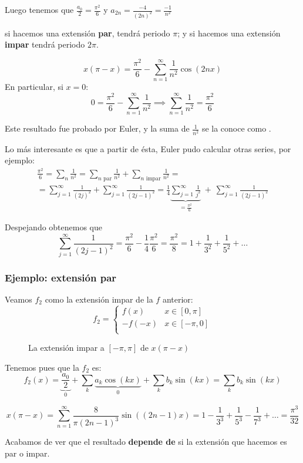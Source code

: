\begin{example}
		Luego tenemos que $\frac{a_0}{2} = \frac{\pi^2}{6}$ y $a_{2n} = \frac{-4}{(2n)^2} = \frac{-1}{n^2}$

		\obs si hacemos una extensión {\bf par}, tendrá periodo $\pi$; y si hacemos una extensión {\bf impar} tendrá periodo $2\pi$.

		\[ x(\pi - x) = \frac{\pi^2}{6} -\sum_{n=1}^{\infty} \frac{1}{n^2} \cos(2n x) \]
		En particular, si $x=0$:
		\[ 0 = \frac{π^2}{6}  - \sum_{n=1}^\infty \frac{1}{n^2} \implies  \sum_{n=1}^\infty \frac{1}{n^2} = \frac{\pi^2}{6} \]

		Este resultado fue probado por Euler, y la suma de $\frac{1}{n^2}$ se la conoce como .

		Lo más interesante es que a partir de ésta, Euler pudo calcular otras series, por ejemplo:
		\begin{gather*}
			\frac{\pi^2}{6} = \sum_n \frac{1}{n^2} = \sum_{n \text{ par}} \frac{1}{n^2} + \sum_{n \text{ impar}} \frac{1}{n^2} =\\
			= \sum_{j=1}^\infty \frac{1}{(2j)^2} + \sum_{j=1}^\infty \frac{1}{(2j-1)^2} = \frac{1}{4} \underbrace{\sum_{j=1}^\infty \frac{1}{j^2}}_{= \frac{\pi^2}{6}} \ + \ \sum_{j=1}^\infty \frac{1}{(2j-1)^2}
		\end{gather*}

		Despejando obtenemos que
		\[ \sum_{j=1}^\infty \frac{1}{(2j-1)^2} = \frac{\pi^2}{6} - \frac{1}{4} \frac{\pi^2}{6} = \frac{\pi^2}{8} = 1 + \frac{1}{3^2} + \frac{1}{5^2} + … \]


		\subsubsection{Ejemplo: extensión par}
		Veamos $f_2$ como la extensión impar de la $f$ anterior:
		\[ f_2 =
		\begin{cases}
		 	f(x) & x \in [0, \pi]\\
		 	-f(-x) & x \in [-\pi, 0]\\
		 \end{cases} \]

		\begin{figure}[hbtp]
			\caption{La extensión impar a $[-\pi,\pi]$ de $x(\pi-x)$}
			\label{fig:EjemploExtensionImpar-03-07}
		\end{figure}

		Tenemos pues que la $f_2$ es:
		\[ f_2(x) = \underbrace{\frac{a_0}{2}}_{0} + \sum_k \underbrace{a_k \cos(kx)}_{0} + \sum_k b_k \sin(kx) =  \sum_k b_k \sin(kx) \]

		\[  x(\pi - x) = \sum_{n=1}^{\infty} \frac{8}{\pi(2n-1)^3} \sin((2n-1)x) = 1 - \frac{1}{3^3} + \frac{1}{5^3} - \frac{1}{7^3} + … = \frac{\pi^3}{32}\]

		\obs Acabamos de ver que el resultado {\bf depende de} si la extensión que hacemos es par o impar.

	\end{example}








